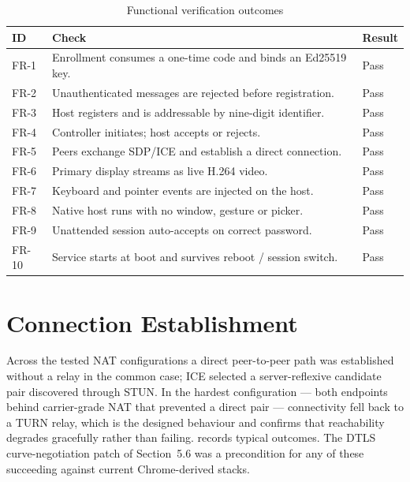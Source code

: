 \begin{table}[H]
\centering
\caption{Functional verification outcomes}
\label{tab:funcresults}
\small
\begin{tabular}{@{}p{1.4cm}p{9.6cm}p{1.8cm}@{}}
\toprule
\textbf{ID} & \textbf{Check} & \textbf{Result} \\
\midrule
FR-1  & Enrollment consumes a one-time code and binds an Ed25519 key. & Pass \\
FR-2  & Unauthenticated messages are rejected before registration. & Pass \\
FR-3  & Host registers and is addressable by nine-digit identifier. & Pass \\
FR-4  & Controller initiates; host accepts or rejects. & Pass \\
FR-5  & Peers exchange SDP/ICE and establish a direct connection. & Pass \\
FR-6  & Primary display streams as live H.264 video. & Pass \\
FR-7  & Keyboard and pointer events are injected on the host. & Pass \\
FR-8  & Native host runs with no window, gesture or picker. & Pass \\
FR-9  & Unattended session auto-accepts on correct password. & Pass \\
FR-10 & Service starts at boot and survives reboot / session switch. & Pass \\
\bottomrule
\end{tabular}
\end{table}

\section{Connection Establishment}

Across the tested NAT configurations a direct peer-to-peer path was established
without a relay in the common case; ICE selected a server-reflexive candidate
pair discovered through STUN. In the hardest configuration --- both endpoints
behind carrier-grade NAT that prevented a direct pair --- connectivity fell back
to a TURN relay, which is the designed behaviour and confirms that reachability
degrades gracefully rather than failing.  records typical
outcomes. The DTLS curve-negotiation patch of Section~5.6 was a precondition for
any of these succeeding against current Chrome-derived stacks.

